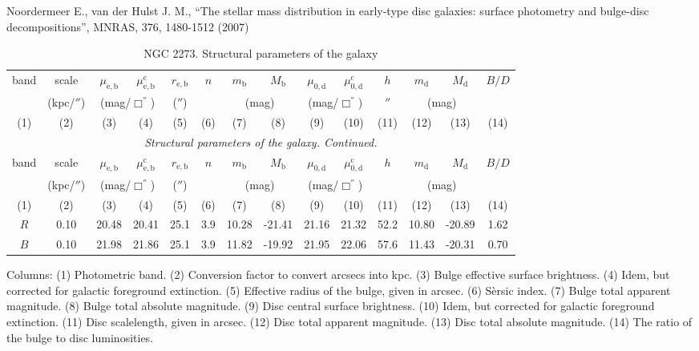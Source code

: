 \documentclass[english,10pt]{article}
\def\mm{\mathrm}
\begin{document}
\noindent
Noordermeer E., van der Hulst J. M., 
``The stellar mass distribution in early-type disc galaxies: surface
photometry and bulge-disc decompositions'', 
MNRAS, 376, 1480-1512 (2007)

\begin{longtable}[c]{cccccccccccccc}
\caption{NGC 2273. Structural parameters of the galaxy} \\ 
\hline 
band & scale & 
$\mu_\mm{e,b}$ & $\mu_\mm{e,b}^\mm{c}$ & $r_\mm{e,b}$ & 
$n$ & $m_\mm{b}$ & $M_\mm{b}$ & 
$\mu_\mm{0,d}$ & $\mu_\mm{0,d}^\mm{c}$ & $h$ & 
$m_\mm{d}$ & $M_\mm{d}$ & $B/D$ \\ 
& (kpc/$''$) & \multicolumn{2}{c}{(mag/$\Box^{''}$)} & ($''$) 
& & \multicolumn{2}{c}{(mag)} & 
\multicolumn{2}{c}{(mag/$\Box^{''}$)} & $''$ & 
\multicolumn{2}{c}{(mag)} & \\
(1)&(2)&(3)&(4)&(5)&(6)&(7)&(8)&(9)&(10)&(11)&(12)&(13)&(14) \\ 
\hline
\endfirsthead 
\hline
\multicolumn{14}{c}{\small\slshape Structural parameters of the galaxy. 
Continued. } \\ \hline
band & scale & 
$\mu_\mm{e,b}$ & $\mu_\mm{e,b}^\mm{c}$ & $r_\mm{e,b}$ & 
$n$ & $m_\mm{b}$ & $M_\mm{b}$ & 
$\mu_\mm{0,d}$ & $\mu_\mm{0,d}^\mm{c}$ & $h$ & 
$m_\mm{d}$ & $M_\mm{d}$ & $B/D$ \\ 
& (kpc/$''$) & \multicolumn{2}{c}{(mag/$\Box^{''}$)} & ($''$) 
& & \multicolumn{2}{c}{(mag)} & 
\multicolumn{2}{c}{(mag/$\Box^{''}$)} & & 
\multicolumn{2}{c}{(mag)} & \\
(1)&(2)&(3)&(4)&(5)&(6)&(7)&(8)&(9)&(10)&(11)&(12)&(13)&(14) \\
\hline
\endhead 
\hline
$R$ & 0.10 & 20.48 & 20.41 & 25.1 & 3.9 & 10.28 & -21.41 & 
21.16 & 21.32 & 52.2 & 10.80 & -20.89 & 1.62 \tabularnewline

$B$ & 0.10 & 21.98 & 21.86 & 25.1 & 3.9 & 11.82 & -19.92 & 
21.95 & 22.06 & 57.6 & 11.43 & -20.31 & 0.70 \tabularnewline
\hline
\end{longtable}

Columns: 
(1) Photometric band. 
(2) Conversion factor to convert arcsecs into kpc.
(3) Bulge effective surface brightness. 
(4) Idem, but corrected for galactic foreground extinction.
(5) Effective radius of the bulge, given in arcsec.
(6) S\`ersic index. 
(7) Bulge total apparent magnitude.
(8) Bulge total absolute magnitude.
(9) Disc central surface brightness. 
(10) Idem, but corrected for galactic foreground extinction.
(11) Disc scalelength, given in arcsec.
(12) Disc total apparent magnitude.
(13) Disc total absolute magnitude. 
(14) The ratio of the bulge to disc luminosities. 
\end{document}
